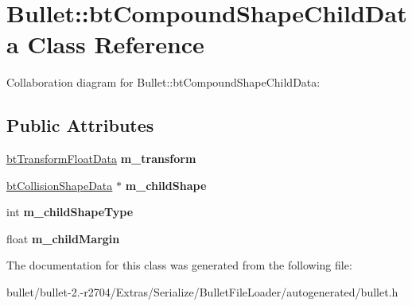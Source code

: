\hypertarget{class_bullet_1_1bt_compound_shape_child_data}{\section{Bullet\+:\+:bt\+Compound\+Shape\+Child\+Data Class Reference}
\label{class_bullet_1_1bt_compound_shape_child_data}
}


Collaboration diagram for Bullet\+:\+:bt\+Compound\+Shape\+Child\+Data\+:
\subsection*{Public Attributes}
\begin{DoxyCompactItemize}
\item 
\hypertarget{class_bullet_1_1bt_compound_shape_child_data_a28e7c60a6603e49e2404ea4f9cdcbdcf}{\hyperlink{class_bullet_1_1bt_transform_float_data}{bt\+Transform\+Float\+Data} {\bfseries m\+\_\+transform}}\label{class_bullet_1_1bt_compound_shape_child_data_a28e7c60a6603e49e2404ea4f9cdcbdcf}

\item 
\hypertarget{class_bullet_1_1bt_compound_shape_child_data_a491141ae40cdb3ca0903e1f0a367a8e3}{\hyperlink{class_bullet_1_1bt_collision_shape_data}{bt\+Collision\+Shape\+Data} $\ast$ {\bfseries m\+\_\+child\+Shape}}\label{class_bullet_1_1bt_compound_shape_child_data_a491141ae40cdb3ca0903e1f0a367a8e3}

\item 
\hypertarget{class_bullet_1_1bt_compound_shape_child_data_addaa8e4b927b9aa905a0ebb4cd4830f5}{int {\bfseries m\+\_\+child\+Shape\+Type}}\label{class_bullet_1_1bt_compound_shape_child_data_addaa8e4b927b9aa905a0ebb4cd4830f5}

\item 
\hypertarget{class_bullet_1_1bt_compound_shape_child_data_ab6a2cbdd5750eef50d7f3371eac6254b}{float {\bfseries m\+\_\+child\+Margin}}\label{class_bullet_1_1bt_compound_shape_child_data_ab6a2cbdd5750eef50d7f3371eac6254b}

\end{DoxyCompactItemize}


The documentation for this class was generated from the following file\+:\begin{DoxyCompactItemize}
\item 
bullet/bullet-\/2.-\/r2704/\+Extras/\+Serialize/\+Bullet\+File\+Loader/autogenerated/bullet.\+h\end{DoxyCompactItemize}

